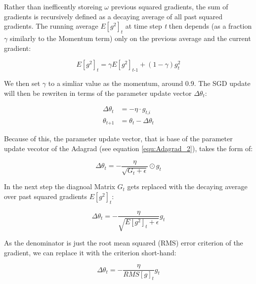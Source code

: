 \documentclass[12pt,oneside,a4paper,parskip]{scrbook}
\begin{document}
Rather than inefficently storeing $\omega$ previous squared gradients, the sum of gradients is recursively defined as a 
decaying average of all past squared gradients. The running average $\textit{E}[\textit{g}^2]_t$  at time step \textit{t} 
then depends (as a fraction $\gamma $ similarly to the Momentum term) only on the previous average and the 
current gradient:

\begin{equation}
\textit{E}[\textit{g}^2]_t = \gamma\textit{E}[\textit{g}^2]_\textit{t-1} + (1-\gamma)\textit{g}^2_t
\end{equation}

We then set $\gamma$ to a simliar value as the momentum, around 0.9. The SGD update will then be rewriten in terms of the 
parameter update vector $\Delta\theta_\textit{t}$:

\begin{equation}
  \begin{split}
    \Delta\theta_\textit{t} &= -\eta \cdot \textit{g}_\textit{t,i} \\
    \theta_\textit{t+1} &= \theta_\textit{t} - \Delta\theta_\textit{t}
  \end{split}
\end{equation}

Because of this, the parameter update vector, that is base of the parameter update vecotor of the Adagrad (see equation \ref{equ:Adagrad_2}), 
takes the form of:

\begin{equation}
  \Delta\theta_\textit{t} = -\frac{\eta}{\sqrt{\textit{G}_\textit{t} + \epsilon}} \odot \textit{g}_\textit{t}
\end{equation}

In the next step the diagnoal Matrix $\textit{G}_t$ gets replaced with the decaying average over past squared gradients 
$\textit{E}[\textit{g}^2]_\textit{t}$:

\begin{equation}
  \Delta\theta_\textit{t} = -\frac{\eta}{\sqrt{\textit{E}[\textit{g}^2]_\textit{t} + \epsilon}} \textit{g}_\textit{t}
\end{equation}

As the denominator is just the root mean squared (RMS) error criterion of the gradient, we can replace
it with the criterion short-hand: 

\begin{equation}
  \Delta\theta_\textit{t} = -\frac{\eta}{RMS[\textit{g}]_t} \textit{g}_\textit{t}
\end{equation}
\end{document}
